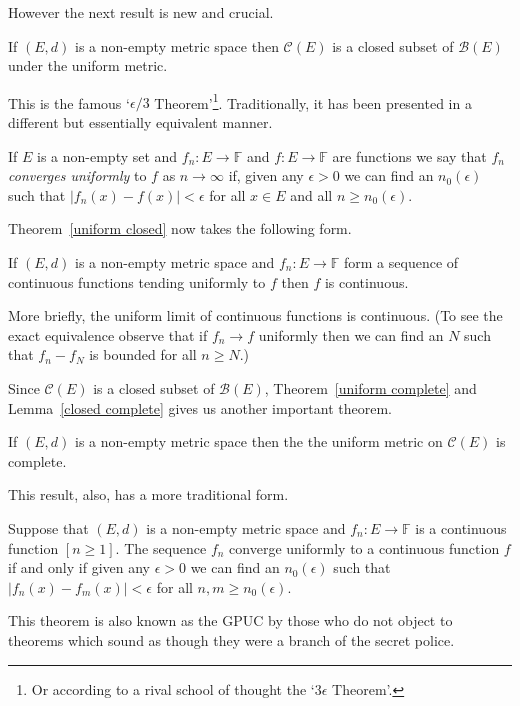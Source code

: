 However the next result is new and crucial.
\begin{theorem}\label{uniform closed}
If $(E,d)$ is a 
non-empty metric space
then $\mathcal{C}(E)$ is a
closed subset of $\mathcal{B}(E)$
under the uniform metric.
\end{theorem}
This is the famous `$\epsilon/3$ Theorem'\footnote{Or
according to a rival school of thought the
`$3\epsilon$ Theorem'.}. Traditionally, it
has been presented in a different but
essentially equivalent manner.
\begin{definition}
If $E$ is a non-empty set and
$f_{n}:E\rightarrow{\mathbb F}$  
and $f:E\rightarrow{\mathbb F}$ 
are functions
we say that $f_{n}$ \emph{converges uniformly}
to $f$ as $n\rightarrow\infty$
if, given any $\epsilon>0$
we can find an $n_{0}(\epsilon)$ such that
$|f_{n}(x)-f(x)|<\epsilon$ for all $x\in E$
and all $n\geq n_{0}(\epsilon)$.
\end{definition}
Theorem~\ref{uniform closed} now takes the following
form.
\begin{theorem} If $(E,d)$ is a non-empty metric space
and $f_{n}:E\rightarrow{\mathbb F}$  form
a sequence of continuous functions tending
uniformly to $f$ then $f$ is continuous.
\end{theorem}
More briefly, the uniform limit of continuous
functions is continuous. (To see the exact
equivalence observe that if $f_{n}\rightarrow f$
uniformly then we can find an $N$ such that
$f_{n}-f_{N}$ is bounded for all $n\geq N$.)

Since $\mathcal{C}(E)$ is a closed subset
of $\mathcal{B}(E)$, Theorem~\ref{uniform complete}
and Lemma~\ref{closed complete}
gives us another important theorem. 
\begin{theorem} If $(E,d)$ is a 
non-empty metric space
then the the uniform metric on $\mathcal{C}(E)$ is 
complete.
\end{theorem}
This result, also, has a more traditional form.
\begin{theorem}
Suppose that $(E,d)$ is a non-empty metric space
and $f_{n}:E\rightarrow{\mathbb F}$ is a continuous
function $[n\geq 1]$.
The sequence $f_{n}$ converge uniformly to
a continuous function $f$ if and only if
given any $\epsilon>0$ we can find an $n_{0}(\epsilon)$
such that $|f_{n}(x)-f_{m}(x)|<\epsilon$ for all
$n,m\geq n_{0}(\epsilon)$.
\end{theorem}
This theorem is also known as the GPUC by those who do
not object to theorems which sound as though they were
a branch of the secret police.

